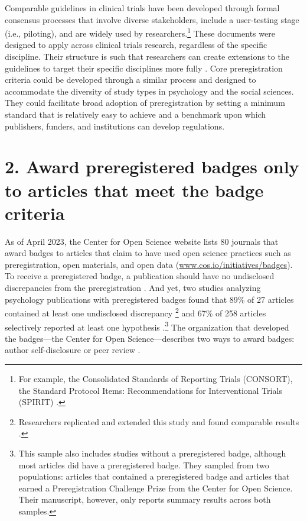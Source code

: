 \documentclass[authordate, meta]{jote-new-article}
\begin{document}
Comparable guidelines in clinical trials have been developed through formal consensus processes that involve diverse stakeholders, include a user-testing stage (i.e., piloting), and are widely used by researchers.\footnote{For example, the Consolidated Standards of Reporting Trials (CONSORT), the Standard Protocol Items: Recommendations for Interventional Trials (SPIRIT) \parencites{Hopewell2022}.} These documents were designed to apply across clinical trials research, regardless of the specific discipline. Their structure is such that researchers can create extensions to the guidelines to target their specific disciplines more fully \parencites[e.g., traditional Chinese medicine:][]{Zhang2020}[pilot trials:][]{Thabane2016}. Core preregistration criteria could be developed through a similar process and designed to accommodate the diversity of study types in psychology and the social sciences. They could facilitate broad adoption of preregistration by setting a minimum standard that is relatively easy to achieve and a benchmark upon which publishers, funders, and institutions can develop regulations.







\section{2. Award preregistered badges only to articles that meet the badge criteria}



As of April 2023, the Center for Open Science website lists 80 journals that award badges to articles that claim to have used open science practices such as preregistration, open materials, and open data (\url{www.cos.io/initiatives/badges}). To receive a preregistered badge, a publication should have no undisclosed discrepancies from the preregistration \parencites{COS2023}. And yet, two studies analyzing psychology publications with preregistered badges found that 89\% of 27 articles contained at least one undisclosed discrepancy \parencites{Claesen2021}\footnote{ Researchers replicated and extended this study and found comparable results \parencites{Weaver2022}.} and 67\% of 258 articles selectively reported at least one hypothesis \parencites{vandenAkker2022}.\footnote{ This sample also includes studies without a preregistered badge, although most articles did have a preregistered badge. They sampled from two populations: articles that contained a preregistered badge and articles that earned a Preregistration Challenge Prize from the Center for Open Science. Their manuscript, however, only reports summary results across both samples.} The organization that developed the badges—the Center for Open Science—describes two ways to award badges: author self-disclosure or peer review \parencites{COS2016}.
\end{document}
